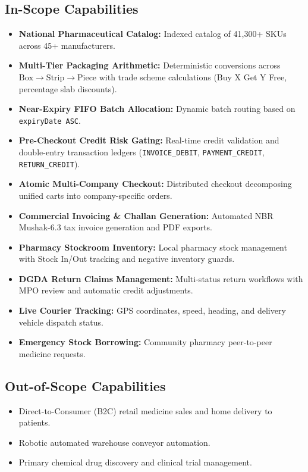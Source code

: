 \documentclass[10pt,a4paper]{article}
\begin{document}
\subsection{In-Scope Capabilities}
\begin{itemize}[leftmargin=*]
    \item \textbf{National Pharmaceutical Catalog:} Indexed catalog of 41,300+ SKUs across 45+ manufacturers.
    \item \textbf{Multi-Tier Packaging Arithmetic:} Deterministic conversions across $\text{Box} \to \text{Strip} \to \text{Piece}$ with trade scheme calculations (Buy X Get Y Free, percentage slab discounts).
    \item \textbf{Near-Expiry FIFO Batch Allocation:} Dynamic batch routing based on \texttt{expiryDate ASC}.
    \item \textbf{Pre-Checkout Credit Risk Gating:} Real-time credit validation and double-entry transaction ledgers (\texttt{INVOICE\_DEBIT}, \texttt{PAYMENT\_CREDIT}, \texttt{RETURN\_CREDIT}).
    \item \textbf{Atomic Multi-Company Checkout:} Distributed checkout decomposing unified carts into company-specific orders.
    \item \textbf{Commercial Invoicing \& Challan Generation:} Automated NBR Mushak-6.3 tax invoice generation and PDF exports.
    \item \textbf{Pharmacy Stockroom Inventory:} Local pharmacy stock management with Stock In/Out tracking and negative inventory guards.
    \item \textbf{DGDA Return Claims Management:} Multi-status return workflows with MPO review and automatic credit adjustments.
    \item \textbf{Live Courier Tracking:} GPS coordinates, speed, heading, and delivery vehicle dispatch status.
    \item \textbf{Emergency Stock Borrowing:} Community pharmacy peer-to-peer medicine requests.
\end{itemize}

\subsection{Out-of-Scope Capabilities}
\begin{itemize}[leftmargin=*]
    \item Direct-to-Consumer (B2C) retail medicine sales and home delivery to patients.
    \item Robotic automated warehouse conveyor automation.
    \item Primary chemical drug discovery and clinical trial management.
\end{itemize}
\end{document}

